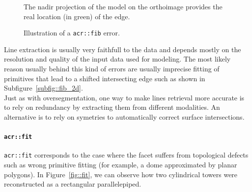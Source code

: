 \begin{figure}[htbp]
{\begin{subfloatrow}
{                                }{
                                    \label{subfig::fib_2d}
                                    \caption{
                                        The nadir projection of the model on the orthoimage provides the real location (in green) of the edge.
                                    }
                                }
                        \end{subfloatrow}
                    }{
                        \caption{
                            \label{fig::fib}
                            Illustration of a \texttt{\gls{acr::fib}} error.
                        }
                    }
                \end{figure}

                Line extraction is usually very faithfull to the data and depends mostly on the resolution and quality of the input data used for modeling.
                The most likely reason usually behind this kind of errors are usually imprecise fitting of primitives that lead to a shifted intersecting edge such as shown in Subfigure~\ref{subfig::fib_2d}.\\

                Just as with oversegmentation, one way to make lines retrieval more accurate is to rely on redundancy by extracting them from different modalities.
                An alternative is to rely on symetries \addref to automatically correct surface intersections.

            \paragraph{\texttt{\acrlong*{acr::fit}}}
                \texttt{\gls{acr::fit}} corresponds to the case where the facet suffers from topological defects such as wrong primitive fitting (for example, a dome approximated by planar polygons).
                In Figure~\ref{fig::fit}, we can observe how two cylindrical towers were reconstructed as a rectangular parallelepiped.\\

